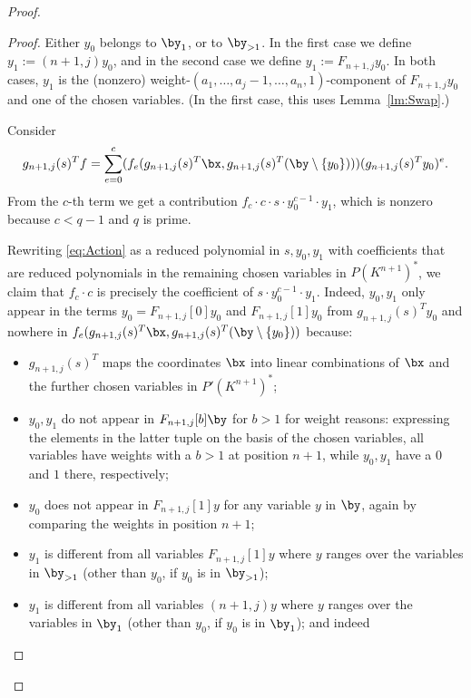 \documentclass{amsart}
\newcommand{\ab}{c} %
\begin{document}
\begin{proof}
\begin{proof}
Either $y_0$ belongs to $\by_1$, or to $\by_{>1}$. In the first
case we define $y_1:=(n+1,j)y_0$, and in the second case we
define $y_1:=F_{n+1,j}y_0$. In both cases, $y_1$ is the (nonzero)
weight-$(a_1,\ldots,a_j-1,\ldots,a_n,1)$-component of $F_{n+1,j}y_0$
and one of the chosen variables.  (In the first case, this uses
Lemma~\ref{lm:Swap}.)

Consider
\begin{equation}  \label{eq:Action}
g_{n+1,j}(s)^T f = \sum_{e=0}^{\ab} (f_e(g_{n+1,j}(s)^T
\bx,g_{n+1,j}(s)^T (\by
\setminus \{y_0\})))(g_{n+1,j}(s)^T y_0)^e.
\end{equation}
From the ${\ab}$-th term we get a contribution $f_{\ab} \cdot {\ab} \cdot s \cdot
y_0^{{\ab}-1} \cdot y_1$, which is nonzero because ${\ab}<q-1$ and $q$ is prime.


Rewriting \eqref{eq:Action} as a reduced polynomial in $s, y_0,y_1$
with coefficients that are reduced polynomials in the remaining chosen
variables in $P(K^{n+1})^*$, we claim that $f_{\ab} \cdot {\ab}$ is precisely
the coefficient of $s \cdot y_0^{{\ab}-1} \cdot y_1$. Indeed, $y_0,y_1$
only appear in the terms $y_0=F_{n+1,j}[0] y_0$ and $F_{n+1,j}[1] y_0$
from $g_{n+1,j}(s)^T y_0$ and nowhere in $f_e(g_{n+1,j}(s)^T
\bx, g_{n+1,j}(s)^T (\by\setminus\{y_0\}))$ because:
\begin{itemize}
\item $g_{n+1,j}(s)^T$ maps the coordinates $\bx$ into linear combinations
of $\bx$ and the further chosen variables in $P'(K^{n+1})^*$;

\item $y_0,y_1$ do not appear in $F_{n+1,j}[b] \by$ for $b>1$ for weight
reasons: expressing the elements in the latter tuple on the basis of the
chosen variables, all variables have weights with a $b>1$
at position $n+1$, while $y_0,y_1$ have a $0$ and $1$ there, respectively;

\item $y_0$ does not appear in $F_{n+1,j}[1] y$ for any
variable $y$ in $\by$, again by comparing the weights in position $n+1$;

\item $y_1$ is different from all variables $F_{n+1,j}[1]y$ where $y$
ranges over the variables in $\by_{>1}$ (other than $y_0$, if $y_0$
is in $\by_{>1}$);

\item $y_1$ is different from all variables $(n+1,j)y$
where $y$ ranges over the variables in $\by_1$ (other than
$y_0$, if $y_0$ is in $\by_1$); and indeed


\end{itemize}
\end{proof}
\end{proof}
\end{document}
